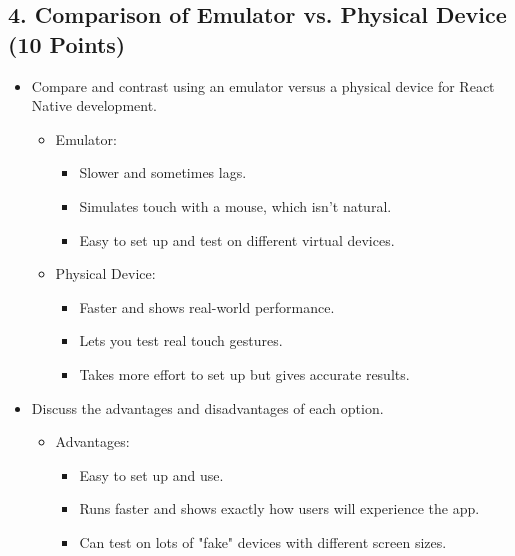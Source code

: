 \documentclass{article}
\begin{document}
\subsection*{4. Comparison of Emulator vs. Physical Device (10 Points)}
\begin{itemize}
    \item Compare and contrast using an emulator versus a physical device for React Native development.

     \begin{itemize}
    
    \item Emulator:

     \begin{itemize}
    
    \item Slower and sometimes lags.
    \item Simulates touch with a mouse, which isn’t natural.
    \item Easy to set up and test on different virtual devices.

    \end{itemize}

    \item Physical Device:

     \begin{itemize}
    
    \item Faster and shows real-world performance.
    \item Lets you test real touch gestures.
    \item Takes more effort to set up but gives accurate results.

    \end{itemize}

    \end{itemize}
    
    \item Discuss the advantages and disadvantages of each option.

    \begin{itemize}
    
    \item Advantages:

     \begin{itemize}
    
    \item Easy to set up and use.
    \item Runs faster and shows exactly how users will experience the app.
    \item Can test on lots of "fake" devices with different screen sizes.


\end{itemize}
\end{itemize}
\end{itemize}
\end{document}
